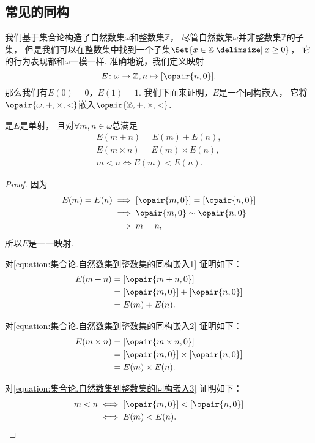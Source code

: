 \subsection{常见的同构}
我们基于集合论构造了自然数集\(\omega\)和整数集\(\mathbb{Z}\)，
尽管自然数集\(\omega\)并非整数集\(\mathbb{Z}\)的子集，
但是我们可以在整数集中找到一个子集\(\Set{ x \in \mathbb{Z} \given x \geq 0 }\)，
它的行为表现都和\(\omega\)一模一样.
准确地说，我们定义映射\[
	E\colon \omega\to\mathbb{Z}, n\mapsto[\opair{n,0}].
\]
那么我们有\(E(0)=0\)，\(E(1)=1\).
我们下面来证明，\(E\)是一个同构嵌入，
它将\(\opair{\omega,+,\times,<}\)嵌入\(\opair{\mathbb{Z},+,\times,<}\).
\begin{theorem}
是\(E\)是单射，
且对\(\forall m,n\in\omega\)总满足
\begin{gather}
	E(m+n)=E(m)+E(n),
	\label{equation:集合论.自然数集到整数集的同构嵌入1} \\
	E(m \times n)=E(m) \times E(n),
	\label{equation:集合论.自然数集到整数集的同构嵌入2} \\
	m<n \iff E(m)<E(n).
	\label{equation:集合论.自然数集到整数集的同构嵌入3}
\end{gather}
\begin{proof}
因为\begin{align*}
	E(m)=E(n)
	&\implies
	[\opair{m,0}]=[\opair{n,0}] \\
	&\implies
	\opair{m,0}\sim\opair{n,0} \\
	&\implies
	m=n,
\end{align*}
所以\(E\)是一一映射.

对\cref{equation:集合论.自然数集到整数集的同构嵌入1} 证明如下：
\begin{align*}
	E(m+n)
	&= [\opair{m+n,0}] \\
	&= [\opair{m,0}]+[\opair{n,0}] \\
	&= E(m)+E(n).
\end{align*}

对\cref{equation:集合论.自然数集到整数集的同构嵌入2} 证明如下：
\begin{align*}
	E(m \times n)
	&= [\opair{m \times n,0}] \\
	&= [\opair{m,0}]\times[\opair{n,0}] \\
	&= E(m) \times E(n).
\end{align*}

对\cref{equation:集合论.自然数集到整数集的同构嵌入3} 证明如下：
\begin{align*}
	m<n
	&\iff
	[\opair{m,0}]<[\opair{n,0}] \\
	&\iff
	E(m)<E(n).
	\qedhere
\end{align*}
\end{proof}
\end{theorem}

